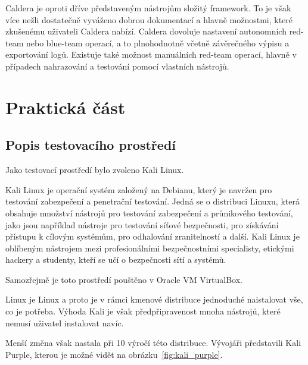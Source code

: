 Caldera je oproti dříve představeným nástrojům složitý framework.
To je však více nežli dostatečně vyváženo dobrou dokumentací a hlavně možnostmi, které zkušenému uživateli Caldera nabízí.
Caldera dovoluje nastavení autonomních red-team nebo blue-team operací, a to plnohodnotně včetně závěrečného výpisu a exportování logů.
Existuje také možnost manuálních red-team operací, hlavně v případech nahrazování a testování pomocí vlastních nástrojů.\cite{mitre_caldera_docs}

\section{Praktická část}


\subsection{Popis testovacího prostředí}\label{subsec:popis-testovaciho-prostredi}
Jako testovací prostředí bylo zvoleno Kali Linux.


Kali Linux je operační systém založený na Debianu, který je navržen pro testování zabezpečení a penetrační testování. Jedná se o distribuci Linuxu, která obsahuje množství nástrojů pro testování zabezpečení a průnikového testování, jako jsou například nástroje pro testování síťové bezpečnosti, pro získávání přístupu k cílovým systémům, pro odhalování zranitelností a další. Kali Linux je oblíbeným nástrojem mezi profesionálními bezpečnostními specialisty, etickými hackery a studenty, kteří se učí o bezpečnosti sítí a systémů.


Samozřejmě je toto prostředí pouštěno v Oracle VM VirtualBox.

\cite{kali_mainpage}

Linux je Linux a proto je v rámci kmenové distribuce jednoduché naistalovat vše, co je potřeba.
Výhoda Kali je však předpřipravenost mnoha nástrojů, které nemusí uživatel instalovat navíc.



Menší změna však nastala při 10 výročí této distribuce\cite{kali_purple}.
Vývojáři představili Kali Purple, kterou je možné vidět na obrázku~\ref{fig:kali_purple}.

